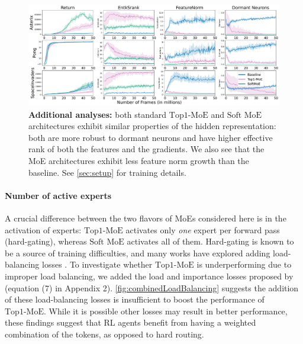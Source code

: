 \documentclass{article}
\theoremstyle{plain}
\theoremstyle{definition}
\theoremstyle{remark}
\newcommand{\moe}{$\textrm{Top1-MoE}$}
\newcommand{\softmoe}{$\textrm{Soft MoE}$}
\begin{document}
\ifarxiv
\else
    \begin{figure}[!t]
        \centering
        \includegraphics[width=\linewidth]{figures/analyses3Games.pdf}
        \caption{{\bf Additional analyses:} both standard \moe{} and \softmoe{} architectures exhibit similar properties of the hidden representation: both are more robust to dormant neurons and have higher effective rank of both the features and the gradients. We also see that the MoE architectures exhibit less feature norm growth than the baseline. See \cref{sec:setup} for training details.}
        \label{fig:feature-statistics}
    \end{figure}
\fi

\paragraph{Number of active experts} A crucial difference between the two flavors of MoEs considered here is in the activation of experts: \moe{} activates only {\em one} expert per forward pass (hard-gating), whereas \softmoe{} activates all of them. Hard-gating is known to be a source of training difficulties, and many works have explored adding load-balancing losses \citep{shazeer2017outrageously,ruiz2021scaling,fedus2022switch,mustafa2022multimodal}. To investigate whether \moe{} is underperforming due to improper load balancing, we added the load and importance losses proposed by \citet{ruiz2021scaling} (equation (7) in Appendix 2). \cref{fig:combinedLoadBalancing} suggests the addition of these load-balancing losses is insufficient to boost the performance of \moe{}. While it is possible other losses may result in better performance, these findings suggest that RL agents benefit from having a weighted combination of the tokens, as opposed to hard routing.
\end{document}

